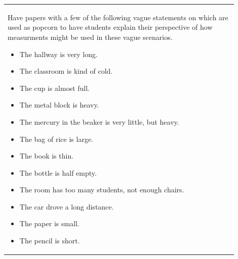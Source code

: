 \documentclass{article}
\begin{document}
\begin{tabular}{|p{0.9\linewidth}|}
\hline
    Have papers with a few of the following vague statements on which are used as popcorn to have students explain their perspective of how measurments might be used in these vague scenarios.

\begin{itemize}
    \item The hallway is very long.
    \item The classroom is kind of cold.
    \item The cup is almost full.
    \item The metal block is heavy.
    \item The mercury in the beaker is very little, but heavy.
    \item The bag of rice is large.
    \item The book is thin.
    \item The bottle is half empty.
    \item The room has too many students, not enough chairs.
    \item The car drove a long distance.
    \item The paper is small.
    \item The pencil is short.
\end{itemize}


\end{tabular}
\end{document}
